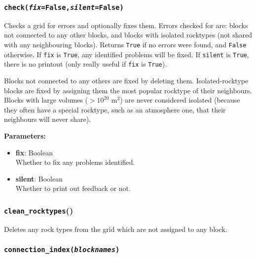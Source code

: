 \begin{snugshade}
\subsubsection{\texttt{check(\emph{fix}=False,\emph{silent}=False)}}
\end{snugshade}
\label{sec:t2grid:check}

Checks a grid for errors and optionally fixes them.  Errors checked for are: blocks not connected to any other blocks, and blocks with isolated rocktypes (not shared with any neighbouring blocks).  Returns \texttt{True} if no errors were found, and \texttt{False} otherwise.  If \texttt{fix} is \texttt{True}, any identified problems will be fixed.  If \texttt{silent} is \texttt{True}, there is no printout (only really useful if \texttt{fix} is \texttt{True}).

Blocks not connected to any others are fixed by deleting them.  Isolated-rocktype blocks are fixed by assigning them the most popular rocktype of their neighbours.  Blocks with large volumes ($> 10^{20}$ m$^3$) are never considered isolated (because they often have a special rocktype, such as an atmosphere one, that their neighbours will never share).

\textbf{Parameters:}
\begin{itemize}
\item \textbf{fix}: Boolean\\
  Whether to fix any problems identified.
\item \textbf{silent}: Boolean\\
  Whether to print out feedback or not.
\end{itemize}

\begin{snugshade}
\subsubsection{\texttt{clean\_rocktypes}()}
\end{snugshade}
\label{sec:t2grid:clean_rocktypes}

Deletes any rock types from the grid which are not assigned to any block.

\begin{snugshade}
\subsubsection{\texttt{connection\_index(\emph{blocknames})}}
\end{snugshade}
\label{sec:t2grid:connection_index}

